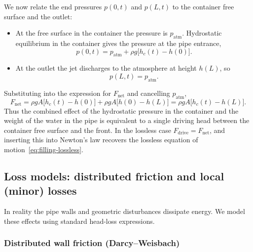 \documentclass[11pt]{article}
\begin{document}
We now relate the end pressures $p(0,t)$ and $p(L,t)$ to the container free surface and the
outlet:
\begin{itemize}
  \item At the free surface in the container the pressure is $p_{\text{atm}}$. Hydrostatic
        equilibrium in the container gives the pressure at the pipe entrance,
        \[
          p(0,t) = p_{\text{atm}} + \rho g\bigl[h_c(t) - h(0)\bigr].
        \]
  \item At the outlet the jet discharges to the atmosphere at height $h(L)$, so
        \[
          p(L,t) = p_{\text{atm}}.
        \]
\end{itemize}
Substituting into the expression for $F_{\text{net}}$ and cancelling $p_{\text{atm}}$,
\[
  F_{\text{net}}
  = \rho g A\bigl[h_c(t) - h(0)\bigr]
    + \rho g A\bigl[h(0) - h(L)\bigr]
  = \rho g A\bigl[h_c(t) - h(L)\bigr].
\]
Thus the combined effect of the hydrostatic pressure in the container and the weight of
the water in the pipe is equivalent to a single driving head between the container free
surface and the front. In the lossless case $F_{\text{drive}} = F_{\text{net}}$, and inserting this
into Newton's law recovers the lossless equation of motion~\eqref{eq:filling-lossless}.

\subsection{Loss models: distributed friction and local (minor) losses}

In reality the pipe walls and geometric disturbances dissipate energy. We model these effects
using standard head-loss expressions.

\subsubsection*{Distributed wall friction (Darcy--Weisbach)}
\end{document}
